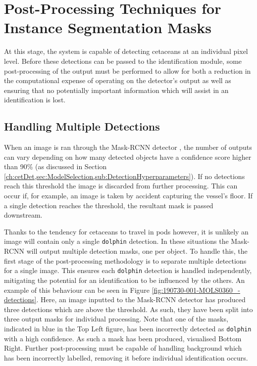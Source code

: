 \chapter{Post-Processing Techniques for Instance Segmentation Masks}\label{ch:postProcessing}

At this stage, the system is capable of detecting cetaceans at an individual pixel level. Before these detections can be passed to the identification module, some post-processing of the output must be performed to allow for both a reduction in the computational expense of operating on the detector's output as well as ensuring that no potentially important information which will assist in an identification is lost. 

\section{Handling Multiple Detections}\label{ch:postProcessing,sec:handlingMultipleDetections}

When an image is ran through the Mask-RCNN detector \cite{he_mask_2017}, the number of outputs can vary depending on how many detected objects have a confidence score higher than 90\% (as discussed in Section \ref{ch:cetDet,sec:ModelSelection,sub:DetectionHyperparameters}). If no detections reach this threshold the image is discarded from further processing. This can occur if, for example, an image is taken by accident capturing the vessel's floor. If a single detection reaches the threshold, the resultant mask is passed downstream. 

Thanks to the tendency for cetaceans to travel in pods however, it is unlikely an image will contain only a single \texttt{dolphin} detection. In these situations the Mask-RCNN will output multiple detection masks, one per object. To handle this, the first stage of the post-processing methodology is to separate multiple detections for a single image. This ensures each \texttt{dolphin} detection is handled independently, mitigating the potential for an identification to be influenced by the others. An example of this behaviour can be seen in Figure \ref{fig:190730-001-MOLS0360_-detections}. Here, an image inputted to the Mask-RCNN detector has produced three detections which are above the threshold. As such, they have been split into three output masks for individual processing. Note that one of the masks, indicated in blue in the Top Left figure, has been incorrectly detected as \texttt{dolphin} with a high confidence. As such a mask has been produced, visualised Bottom Right. Further post-processing must be capable of handling background which has been incorrectly labelled, removing it before individual identification occurs.

